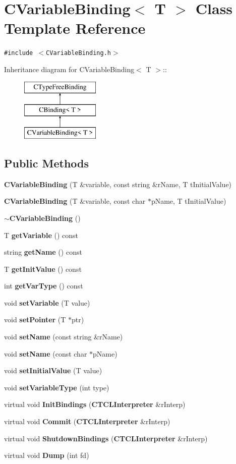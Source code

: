 \section{CVariable\-Binding$<$ T $>$  Class Template Reference}
\label{classCVariableBinding}
{\tt \#include $<$CVariable\-Binding.h$>$}

Inheritance diagram for CVariable\-Binding$<$ T $>$::\begin{figure}[H]
\begin{center}
\leavevmode
\includegraphics[height=3cm]{classCVariableBinding}
\end{center}
\end{figure}
\subsection*{Public Methods}
\begin{CompactItemize}
\item 
{\bf CVariable\-Binding} (T \&variable, const string \&r\-Name, T t\-Initial\-Value)
\item 
{\bf CVariable\-Binding} (T \&variable, const char $\ast$p\-Name, T t\-Initial\-Value)
\item 
{\bf $\sim$CVariable\-Binding} ()
\item 
T {\bf get\-Variable} () const
\item 
string {\bf get\-Name} () const
\item 
T {\bf get\-Init\-Value} () const
\item 
int {\bf get\-Var\-Type} () const
\item 
void {\bf set\-Variable} (T value)
\item 
void {\bf set\-Pointer} (T $\ast$ptr)
\item 
void {\bf set\-Name} (const string \&r\-Name)
\item 
void {\bf set\-Name} (const char $\ast$p\-Name)
\item 
void {\bf set\-Initial\-Value} (T value)
\item 
void {\bf set\-Variable\-Type} (int type)
\item 
virtual void {\bf Init\-Bindings} ({\bf CTCLInterpreter} \&r\-Interp)
\item 
virtual void {\bf Commit} ({\bf CTCLInterpreter} \&r\-Interp)
\item 
virtual void {\bf Shutdown\-Bindings} ({\bf CTCLInterpreter} \&r\-Interp)
\item 
virtual void {\bf Dump} (int fd)
\end{CompactItemize}
